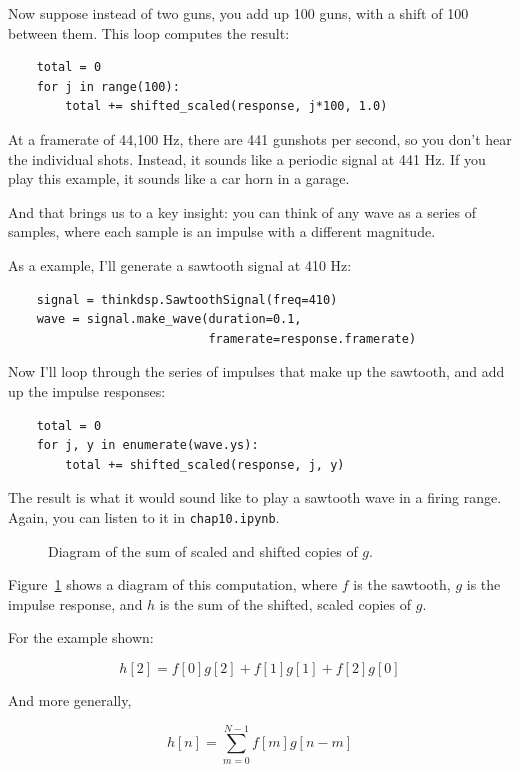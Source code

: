 \documentclass[12pt]{book}
\begin{document}
Now suppose instead of two guns, you add up 100 guns, with
a shift of 100 between them.  This loop computes the result:

\begin{verbatim}
    total = 0
    for j in range(100):
        total += shifted_scaled(response, j*100, 1.0)
\end{verbatim}

At a framerate of 44,100 Hz, there are 441 gunshots per second,
so you don't hear the individual shots.  Instead, it sounds
like a periodic signal at 441 Hz.  If you play this example, it
sounds like a car horn in a garage.

And that brings us to a key insight: you can think of any wave as a
series of samples, where each sample is an impulse with a different
magnitude.

As a example, I'll generate a sawtooth signal at 410 Hz:

\begin{verbatim}
    signal = thinkdsp.SawtoothSignal(freq=410)
    wave = signal.make_wave(duration=0.1,
                            framerate=response.framerate)
\end{verbatim}

Now I'll loop through the series of impulses that make up the
sawtooth, and add up the impulse responses:

\begin{verbatim}
    total = 0
    for j, y in enumerate(wave.ys):
        total += shifted_scaled(response, j, y)
\end{verbatim}

The result is what it would sound like to play a sawtooth wave in a
firing range.  Again, you can listen to it in {\tt chap10.ipynb}.

\begin{figure}

\caption{Diagram of the sum of scaled and shifted copies of $g$.}
\label{fig.convolution}
\end{figure}

Figure~\ref{fig.convolution} shows a diagram of this computation,
where $f$ is the sawtooth, $g$ is the impulse response, and $h$
is the sum of the shifted, scaled copies of $g$.

For the example shown:

\[ h[2] = f[0]g[2] + f[1]g[1] + f[2]g[0]  \]

And more generally,

\[ h[n] = \sum_{m=0}^{N-1} f[m] g[n-m]  \]
\end{document}
